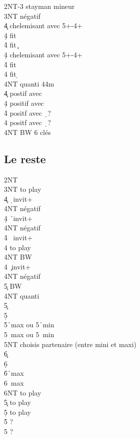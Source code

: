 \documentclass[a4paper]{article}
\begin{document}
\begin{bidtable}
2NT-3\s \> stayman mineur\\
3NT \> négatif\+\\
4\c \> chelemisant avec 5+-4+\+\\
4\d \> fit \d \\
4\h\s \> fit \c \-\\
4\d \> chelemisant avec 5+-4+\+\\
4\h \> fit \c \\
4\s \> fit \d \-\\
4NT \> quanti 44m\-\\
4\c \> postif avec \c \\
4\d \> positif avec \d \\
4\h \> positf avec \d\ ?\\
4\s \> positf avec \d\ ?\\
4NT \> BW 6 clés
\end{bidtable}

\subsection{Le reste}

\begin{bidtable}
2NT\+\\
3NT \> to play\\
4\c \> \d\ invit+\+\\
4NT \> négatif\-\\
4\d \> \h\ invit+\+\\
4NT \> négatif\-\\
4\h \> \s\ invit+\+\\
4\s \> to play\\
4NT \> BW\-\\
4\s \> \c\ invit+\+\\
4NT \> négatif\\
5\c \> BW\-\\
4NT \> quanti\+\\
5\c {}\c \\
5\d {}\d \\
5\h {}\h\ max ou 5\h\ min\\
5\s {}\s\ max ou 5\s\ min\\
5NT \> choisis partenaire (entre mini et maxi)\\
6\c {}\c \\
6\d {}\d \\
6\h {}\h\ max\\
6\s {}\s\ max\\
6NT \> to play\-\\
5\c \> to play\\
5\d \> to play\\
5\h \> ?\\
5\s \> ?\-
\end{bidtable}
\end{document}
